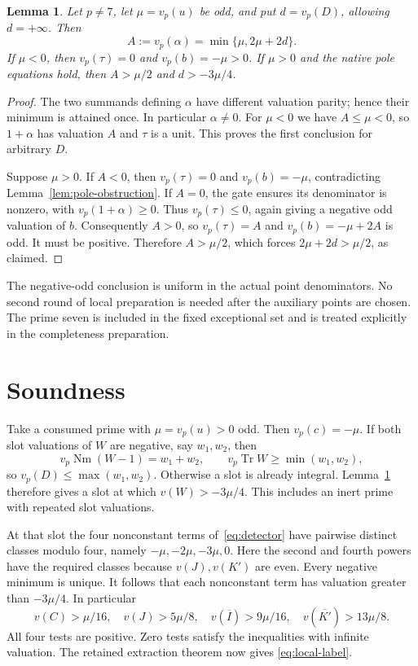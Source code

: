 \documentclass[11pt,a4paper]{article}
\newtheorem{lemma}[theorem]{Lemma}
\DeclareMathOperator{\Tr}{Tr}\DeclareMathOperator{\Nm}{Nm}
\begin{document}
\begin{lemma}\label{lem:normalizer}
Let $p\ne7$, let $\mu=v_p(u)$ be odd, and put $d=v_p(D)$, allowing
$d=+\infty$. Then
\[
 A:=v_p(\alpha)=\min\{\mu,2\mu+2d\}.
\]
If $\mu<0$, then $v_p(\tau)=0$ and $v_p(b)=-\mu>0$.
If $\mu>0$ and the native pole equations hold, then
$A>\mu/2$ and $d>-3\mu/4$.
\end{lemma}
\begin{proof}
The two summands defining $\alpha$ have different valuation parity;
hence their minimum is attained once. In particular $\alpha\ne0$.
For $\mu<0$ we have $A\le\mu<0$, so $1+\alpha$ has valuation $A$
and $\tau$ is a unit. This proves the first conclusion for arbitrary $D$.

Suppose $\mu>0$. If $A<0$, then $v_p(\tau)=0$ and $v_p(b)=-\mu$,
contradicting Lemma~\ref{lem:pole-obstruction}. If $A=0$, the gate
ensures its denominator is nonzero, with $v_p(1+\alpha)\ge0$.
Thus $v_p(\tau)\le0$, again giving a negative odd valuation of $b$.
Consequently $A>0$, so $v_p(\tau)=A$ and
$v_p(b)=-\mu+2A$ is odd. It must be positive. Therefore
$A>\mu/2$, which forces $2\mu+2d>\mu/2$, as claimed.
\end{proof}

The negative-odd conclusion is uniform in the actual point denominators.
No second round of local preparation is needed after the auxiliary points
are chosen. The prime seven is included in the fixed exceptional set and
is treated explicitly in the completeness preparation.

\section{Soundness}

Take a consumed prime with $\mu=v_p(u)>0$ odd. Then $v_p(c)=-\mu$.
If both slot valuations of $W$ are negative, say $w_1,w_2$, then
\[
 v_p\Nm(W-1)=w_1+w_2,\qquad
 v_p\Tr W\ge\min(w_1,w_2),
\]
so $v_p(D)\le\max(w_1,w_2)$. Otherwise a slot is already integral.
Lemma~\ref{lem:normalizer} therefore gives a slot at which
$v(W)>-3\mu/4$. This includes an inert prime with repeated slot
valuations.

At that slot the four nonconstant terms of~\eqref{eq:detector} have
pairwise distinct classes modulo four, namely $-\mu,-2\mu,-3\mu,0$.
Here the second and fourth powers have the required classes because
$v(J),v(K')$ are even. Every negative minimum is unique. It follows
that each nonconstant term has valuation greater than $-3\mu/4$.
In particular
\[
 v(C)>\mu/16,\quad v(J)>5\mu/8,\quad
 v(\overline I)>9\mu/16,\quad v(\overline{K'})>13\mu/8.
\]
All four tests are positive. Zero tests satisfy the inequalities with
infinite valuation. The retained extraction theorem now gives
\eqref{eq:local-label}.
\end{document}
